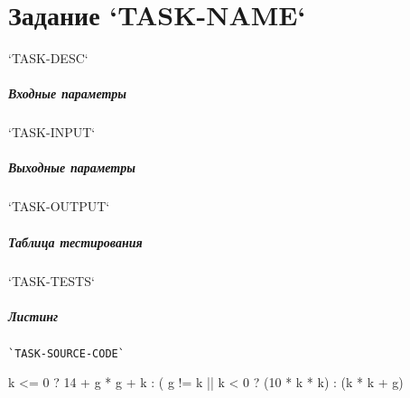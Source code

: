 \chapter{Задание `TASK-NAME`}

`TASK-DESC`

\paragraph{Входные параметры}

`TASK-INPUT`

\paragraph{Выходные параметры}

`TASK-OUTPUT`

\paragraph{Таблица тестирования}

`TASK-TESTS`

\paragraph{Листинг}
\begin{verbatim}
`TASK-SOURCE-CODE`
\end{verbatim}

\begin{equasion}
k <= 0 ? 14 + g * g + k : ( g != k || k < 0 ? (10 * k * k) : (k * k + g)
\end{equasion}
